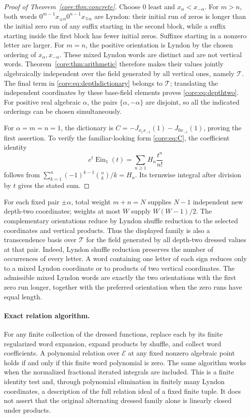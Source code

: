 \documentclass[11pt,a4paper]{article}
\newcommand{\E}{\mathcal E}
\newcommand{\T}{\mathcal T}
\DeclareMathOperator{\Ein}{Ein}
\theoremstyle{definition}
\theoremstyle{remark}
\numberwithin{equation}{section}
\begin{document}
\begin{proof}[Proof of Theorem~\ref{core:thm:concrete}]
Choose $0$ least and $x_\alpha<x_{-\alpha}$. For $m>n$, both words
$0^{m-1}x_{\pm\alpha}0^{n-1}x_{\mp\alpha}$ are Lyndon: their
initial run of zeros is longer than the initial zero run of any
suffix starting in the second block, while a suffix starting inside
the first block has fewer initial zeros. Suffixes starting in a
nonzero letter are larger. For $m=n$, the positive orientation is
Lyndon by the chosen ordering of $x_\alpha,x_{-\alpha}$.
These mixed Lyndon words are distinct and are not vertical words.
Theorem~\ref{core:thm:arithmetic} therefore makes their values jointly
algebraically independent over the field generated by all vertical
ones, namely $\T$. The final term in \eqref{core:eq:depthdictionary}
belongs to $\T$; translating the independent coordinates by these
base-field elements proves \eqref{core:eq:depthtwo}. For positive real
algebraic $\alpha$, the pairs $\{\alpha,-\alpha\}$ are disjoint,
so all the indicated orderings can be chosen simultaneously.

For $\alpha=m=n=1$, the dictionary is
$C=-J_{x_1x_{-1}}(1)-J_{0x_{-1}}(1)$, proving the first assertion.
To verify the familiar-looking form \eqref{core:eq:C}, the coefficient
identity
\[
 e^t\Ein_1(t)=\sum_{n\ge1}H_n\frac{t^n}{n!}
\]
follows from $\sum_{k=1}^n(-1)^{k-1}\binom nk/k=H_n$.
Its termwise integral after division by $t$ gives the stated sum.
\end{proof}

For each fixed pair $\pm\alpha$, total weight $m+n=N$ supplies $N-1$
independent new depth-two coordinates; weights at most $W$ supply
$W(W-1)/2$. The complementary orientations reduce by Lyndon shuffle
reduction to the selected coordinates and vertical products. Thus
the displayed family is also a transcendence basis over $\T$ for
the field generated by all depth-two dressed values at that pair.
Indeed, Lyndon shuffle reduction preserves the number of occurrences
of every letter. A word containing one letter of each sign reduces
only to a mixed Lyndon coordinate or to products of two vertical
coordinates. The admissible mixed Lyndon words are exactly the two
orientations with the first zero run longer, together with the
preferred orientation when the zero runs have equal length.

\paragraph{Exact relation algorithm.}
For any finite collection of the dressed functions, replace each by
its finite regularized word expansion, expand products by shuffle,
and collect word coefficients. A polynomial relation over $\E$ at
any fixed nonzero algebraic point holds if and only if this finite
word polynomial is zero. The same algorithm works when the normalized
fractional iterated integrals are included. This is a finite identity
test and, through polynomial elimination in finitely many Lyndon
coordinates, a description of the full relation ideal of a fixed
finite tuple. It does not assert that the original alternating
dressed family alone is linearly closed under products.
\end{document}
